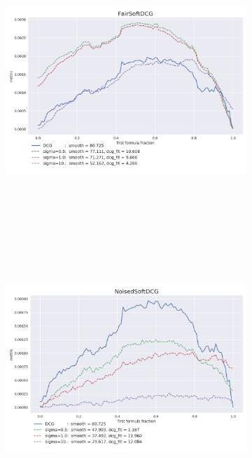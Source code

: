 \documentclass[14pt,a4paper]{amsart}
\theoremstyle{definition}
\theoremstyle{definition}
\begin{document}
\begin{figure}[!h]
    \centering
    \begin{subfigure}{\textwidth}
    \centering
        \includegraphics[height=10cm, width=\textwidth]{fair_formula_mix_std}
     \end{subfigure}
\end{figure}

\begin{figure}[!h]
    \centering
    \begin{subfigure}{\textwidth}
    \centering
        \includegraphics[height=10cm, width=\textwidth]{noised_formula_mix}
     \end{subfigure}
\end{figure}
\end{document}

